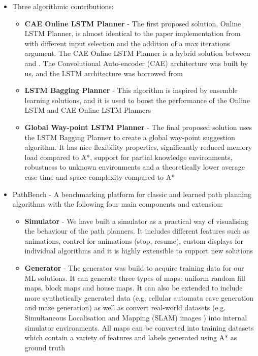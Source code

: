 \begin{itemize}
    \item Three algorithmic contributions: \begin{itemize}
        \item \textbf{CAE Online LSTM Planner} - The first proposed solution, Online LSTM Planner, is almost identical to the paper implementation from \cite{nicola2018lstm} with different input selection and the addition of a max iterations argument. The CAE Online LSTM Planner is a hybrid solution between \cite{nicola2018lstm} and \cite{inoue2019robot}. The Convolutional Auto-encoder (CAE) architecture was built by us, and the LSTM architecture was borrowed from \cite{nicola2018lstm}
        \item \textbf{LSTM Bagging Planner} - This algorithm is inspired by ensemble learning solutions, and it is used to boost the performance of the Online LSTM and CAE Online LSTM Planners
        \item \textbf{Global Way-point LSTM Planner} - The final proposed solution uses the LSTM Bagging Planner to create a global way-point suggestion algorithm. It has nice flexibility properties, significantly reduced memory load compared to A*, support for partial knowledge environments, robustness to unknown environments and a theoretically lower average case time and space complexity compared to A*
    \end{itemize}
    \item PathBench - A benchmarking platform for classic and learned path planning algorithms with the following four main components and extension: 
    \begin{itemize}
        \item \textbf{Simulator} - We have built a simulator as a practical way of visualising the behaviour of the path planners. It includes different features such as animations, control for animations (stop, resume), custom displays for individual algorithms and it is highly extensible to support new solutions
        \item \textbf{Generator} - The generator was build to acquire training data for our ML solutions. It can generate three types of maps: uniform random fill maps, block maps and house maps. It can also be extended to include more synthetically generated data (e.g. cellular automata cave generation and maze generation) as well as convert real-world datasets (e.g. Simultaneous Localisation and Mapping (SLAM) images \cite{dissanayake2001solution}) into internal simulator environments. All maps can be converted into training datasets which contain a variety of features and labels generated using A* as ground truth

\end{itemize}
\end{itemize}
